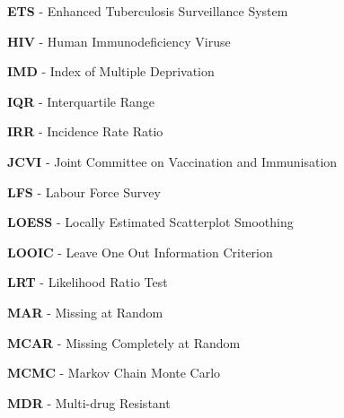 \documentclass[11pt,twoside]{bristolthesis}
\begin{document}
\begin{acronyms}
      \textbf{ETS} - Enhanced Tuberculosis Surveillance System
      
      \par
      
      \textbf{HIV} - Human Immunodeficiency Viruse
      
      \par
      
      \textbf{IMD} - Index of Multiple Deprivation
      
      \par
      
      \textbf{IQR} - Interquartile Range
      
      \par
      
      \textbf{IRR} - Incidence Rate Ratio
      
      \par
      
      \textbf{JCVI} - Joint Committee on Vaccination and Immunisation
      
      \par
      
      \textbf{LFS} - Labour Force Survey
      
      \par
      
      \textbf{LOESS} - Locally Estimated Scatterplot Smoothing
      
      \par
      
      \textbf{LOOIC} - Leave One Out Information Criterion
      
      \par
      
      \textbf{LRT} - Likelihood Ratio Test
      
      \par
      
      \textbf{MAR} - Missing at Random
      
      \par
      
      \textbf{MCAR} - Missing Completely at Random
      
      \par
      
      \textbf{MCMC} - Markov Chain Monte Carlo
      
      \par
      
      \textbf{MDR} - Multi-drug Resistant
      

\end{acronyms}
\end{document}
